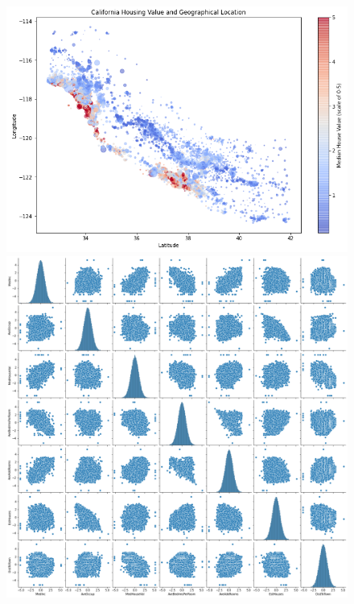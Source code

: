 \documentclass[11pt]{article}
\begin{document}
\begin{figure}[h]
    \label{california_eda}
    \centering
    \begin{minipage}{0.45\textwidth}
        \centering
        \includegraphics[height=0.8\linewidth]{figures/03_bayesian_linear_regression/california_housing_geoplot.png}
    \end{minipage}\hfill
    \begin{minipage}{0.45\textwidth}
        \centering
        \includegraphics[height=0.8\linewidth]{figures/03_bayesian_linear_regression/california_housing_feature_correlations.png}
    \end{minipage}
\end{figure}
\end{document}
